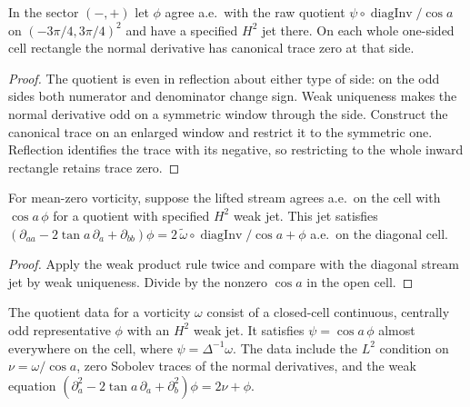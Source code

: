 \begin{lemma}
\label{lem:mixed-quotient-normal-zero}
\leanok
In the sector $(-,+)$ let $\phi$ agree a.e.\ with the raw quotient
$\psi\circ\operatorname{diagInv}/\cos a$ on $(-3\pi/4,3\pi/4)^2$ and
have a specified $H^2$ jet there. On each whole one-sided cell rectangle
the normal derivative has canonical trace zero at that side.
\end{lemma}

\begin{proof}
\leanok
The quotient is even in reflection about either type of side: on the odd
sides both numerator and denominator change sign. Weak uniqueness makes
the normal derivative odd on a symmetric window through the side.
Construct the canonical trace on an enlarged window and restrict it to the
symmetric one. Reflection identifies the trace with its negative, so
restricting to the whole inward rectangle retains trace zero.
\end{proof}

\begin{lemma}
\label{lem:mixed-divided-equation}
\leanok
For mean-zero vorticity, suppose the lifted stream agrees a.e.\ on the cell
with $\cos a\,\phi$ for a quotient with specified $H^2$ weak jet. This jet
satisfies
$(\partial_{aa}-2\tan a\,\partial_a+\partial_{bb})\phi
=2\,\widetilde\omega\circ\operatorname{diagInv}/\cos a+\phi$
a.e.\ on the diagonal cell.
\end{lemma}

\begin{proof}
\leanok
Apply the weak product rule twice and compare with the diagonal stream
jet by weak uniqueness. Divide by the nonzero $\cos a$ in the open cell.
\end{proof}

\begin{definition}
\label{def:mixed-quotient-data}
\leanok
The quotient data for a vorticity $\omega$ consist of a closed-cell
continuous, centrally odd representative $\phi$ with an $H^2$ weak jet.
It satisfies $\psi=\cos a\,\phi$ almost everywhere on the cell, where
$\psi=\Delta^{-1}\omega$. The data include the $L^2$ condition on
$\nu=\omega/\cos a$, zero Sobolev traces of the normal derivatives,
and the weak equation
$(\partial_a^2-2\tan a\,\partial_a+\partial_b^2)\phi=2\nu+\phi$.
\end{definition}

